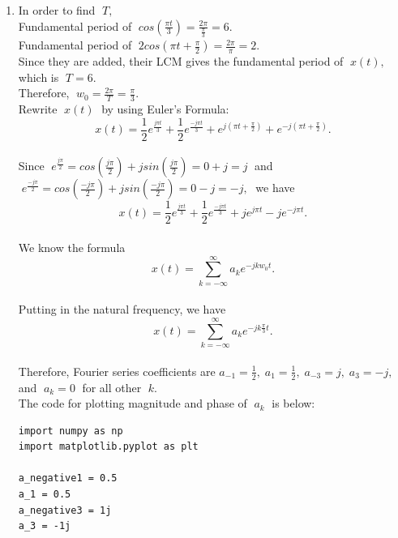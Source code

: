\documentclass[10pt,a4paper, margin=1in]{article}
\begin{document}
\begin{enumerate}
\item %
In order to find $\;T,$\vspace{0.3cm}\\
Fundamental period of $\; cos(\frac{\pi t}{3}) = \frac{2\pi}{\frac{\pi}{3}} = 6.$\vspace{0.3cm}\\
Fundamental period of $\; 2cos(\pi t + \frac{\pi}{2}) = \frac{2\pi}{\pi} = 2.$\vspace{0.3cm}\\
Since they are added, their LCM gives the fundamental period of $\; x(t), \;$ which is $\; T=6.$\vspace{0.3cm}\\
Therefore, $\; w_0 = \frac{2\pi}{T} = \frac{\pi}{3}.$\vspace{0.3cm}\\
Rewrite $\; x(t) \;$ by using Euler's Formula:
$$x(t) = \frac{1}{2}e^{\frac{j\pi t}{3}} + \frac{1}{2}e^{\frac{-j\pi t}{3}} + e^{j(\pi t + \frac{\pi}{2})} + e^{-j(\pi t + \frac{\pi}{2})}.$$\vspace{0.3cm}\\
Since $\; e^{\frac{j\pi}{2}} = cos(\frac{j\pi}{2}) + jsin(\frac{j\pi}{2}) = 0 + j = j \;$ and $\; e^{\frac{-j\pi}{2}} = cos(\frac{-j\pi}{2}) + jsin(\frac{-j\pi}{2}) = 0 - j = -j, \;$ we have
$$x(t) = \frac{1}{2}e^{\frac{j\pi t}{3}} + \frac{1}{2}e^{\frac{-j\pi t}{3}} + je^{j\pi t} - je^{-j\pi t}.$$\vspace{0.3cm}\\
We know the formula
$$x(t) = \sum_{k=-\infty}^{\infty} a_k e^{-jkw_0t}.$$\vspace{0.3cm}\\
Putting in the natural frequency, we have
$$x(t) = \sum_{k=-\infty}^{\infty} a_k e^{-jk\frac{\pi}{3}t}.$$\vspace{0.3cm}\\
Therefore, Fourier series coefficients are
$a_{-1} = \frac{1}{2}, \; a_1 = \frac{1}{2}, \; a_{-3} = j, \; a_3 = -j, \;$ and $\; a_k = 0 \;$ for all other $\; k.$\vspace{0.3cm}\\
The code for plotting magnitude and phase of $\; a_k \;$ is below:\vspace{0.3cm}\\
\begin{lstlisting}
import numpy as np
import matplotlib.pyplot as plt

a_negative1 = 0.5
a_1 = 0.5
a_negative3 = 1j
a_3 = -1j


\end{lstlisting}
\end{enumerate}
\end{document}
